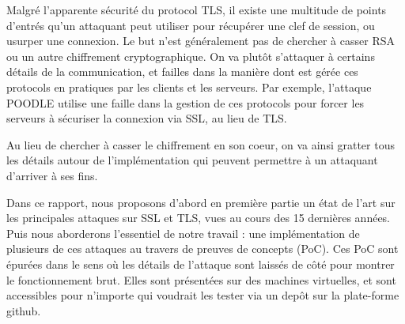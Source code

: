 Malgré l'apparente sécurité du protocol TLS, il existe une multitude de points d'entrés qu'un attaquant peut utiliser pour récupérer une clef de session, ou usurper une connexion. Le but n'est généralement pas de chercher à casser RSA ou un autre chiffrement cryptographique. On va plutôt s'attaquer à certains détails de la communication, et failles dans la manière dont est gérée ces protocols en pratiques par les clients et les serveurs. Par exemple, l'attaque POODLE utilise une faille dans la gestion de ces protocols pour forcer les serveurs à sécuriser la connexion via SSL, au lieu de TLS.

Au lieu de chercher à casser le chiffrement en son coeur, on va ainsi gratter tous les détails autour de l'implémentation qui peuvent permettre à un attaquant d'arriver à ses fins.

Dans ce rapport, nous proposons d'abord en première partie un état de l'art sur les principales attaques sur SSL et TLS, vues au cours des 15 dernières années. Puis nous aborderons l'essentiel de notre travail : une implémentation de plusieurs de ces attaques au travers de preuves de concepts (PoC). Ces PoC sont épurées dans le sens où les détails de l'attaque sont laissés de côté pour montrer le fonctionnement brut. Elles sont présentées sur des machines virtuelles, et sont accessibles pour n'importe qui voudrait les tester via un depôt sur la plate-forme github.
